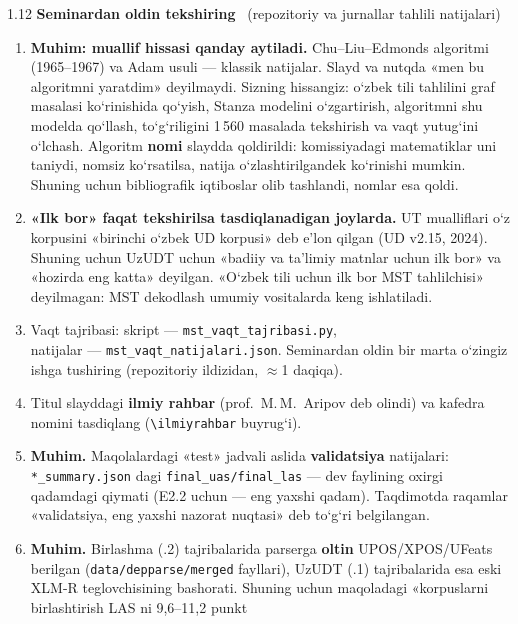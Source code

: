 \documentclass[14pt,a4paper]{extarticle}
\begin{document}
\begin{spacing}{1.12}
\vspace{0.6em}
\noindent\textbf{Seminardan oldin tekshiring} \ {\small (repozitoriy va jurnallar tahlili natijalari)}
\begin{enumerate}[itemsep=2pt]\raggedright
  \item \textbf{Muhim: muallif hissasi qanday aytiladi.} Chu--Liu--Edmonds algoritmi (1965--1967) va
        Adam usuli --- klassik natijalar. Slayd va nutqda «men bu algoritmni yaratdim» deyilmaydi.
        Sizning hissangiz: o‘zbek tili tahlilini graf masalasi ko‘rinishida qo‘yish, Stanza modelini
        o‘zgartirish, algoritmni shu modelda qo‘llash, to‘g‘riligini 1\,560 masalada tekshirish va vaqt
        yutug‘ini o‘lchash. Algoritm \textbf{nomi} slaydda qoldirildi: komissiyadagi matematiklar uni
        taniydi, nomsiz ko‘rsatilsa, natija o‘zlashtirilgandek ko‘rinishi mumkin. Shuning uchun
        bibliografik iqtiboslar olib tashlandi, nomlar esa qoldi.
  \item \textbf{«Ilk bor» faqat tekshirilsa tasdiqlanadigan joylarda.} UT mualliflari o‘z korpusini
        «birinchi o‘zbek UD korpusi» deb e’lon qilgan (UD v2.15, 2024). Shuning uchun UzUDT uchun
        «badiiy va ta’limiy matnlar uchun ilk bor» va «hozirda eng katta» deyilgan. «O‘zbek tili uchun
        ilk bor MST tahlilchisi» deyilmagan: MST dekodlash umumiy vositalarda keng ishlatiladi.
  \item Vaqt tajribasi: skript --- \texttt{mst\_vaqt\_tajribasi.py},\\ natijalar ---
        \texttt{mst\_vaqt\_natijalari.json}. Seminardan oldin bir marta o‘zingiz ishga tushiring
        (repozitoriy ildizidan, $\approx$1 daqiqa).
  \item Titul slayddagi \textbf{ilmiy rahbar} (prof.~M.\,M.~Aripov deb olindi) va kafedra nomini
        tasdiqlang (\texttt{\textbackslash ilmiyrahbar} buyrug‘i).
  \item \textbf{Muhim.} Maqolalardagi «test» jadvali aslida \textbf{validatsiya} natijalari:
        \texttt{*\_summary.json} dagi \texttt{final\_uas/final\_las} --- dev faylining oxirgi
        qadamdagi qiymati (E2.2 uchun --- eng yaxshi qadam). Taqdimotda raqamlar «validatsiya,
        eng yaxshi nazorat nuqtasi» deb to‘g‘ri belgilangan.
  \item \textbf{Muhim.} Birlashma (.2) tajribalarida parserga \textbf{oltin} UPOS/XPOS/UFeats berilgan
        (\texttt{data/depparse/merged} fayllari), UzUDT (.1) tajribalarida esa eski XLM-R teglovchisining
        bashorati. Shuning uchun maqoladagi «korpuslarni birlashtirish LAS ni 9,6--11,2 punkt

\end{enumerate}
\end{spacing}
\end{document}
